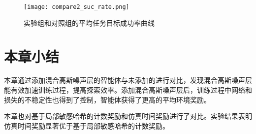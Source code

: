         \begin{figure}[htpb]
        \centering
        \texttt{[image: compare2\_suc\_rate.png]}
        \caption{实验组和对照组的平均任务目标成功率曲线}
            \label{cmp2suc_rate}
        \end{figure}
\section{本章小结}
本章通过添加混合高斯噪声层的智能体与未添加的进行对比，发现混合高斯噪声层能有效加速训练过程，提高探索效率。添加混合高斯噪声层后，训练过程中网络和损失的不稳定性也得到了控制，智能体获得了更高的平均环境奖励。

本章也对基于局部敏感哈希的计数奖励和仿真时间奖励进行了对比。实验结果表明仿真时间奖励显著优于基于局部敏感哈希的计数奖励。

